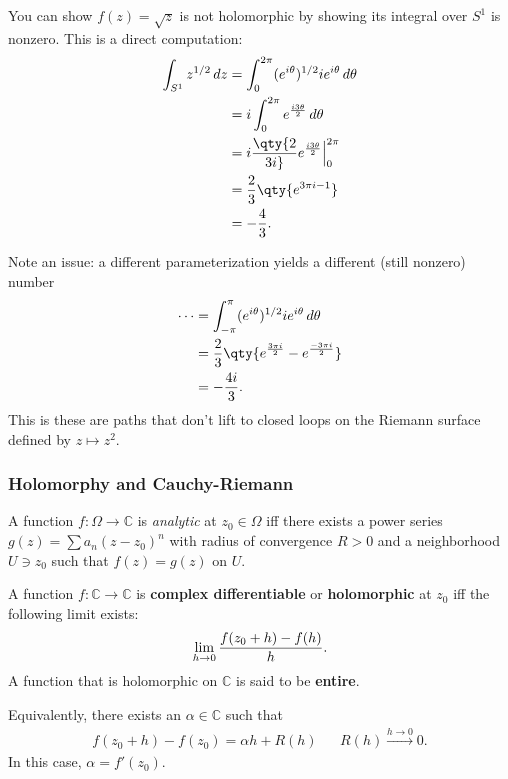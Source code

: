 \begin{example}[?]

You can show \(f(z) = \sqrt{z}\) is not holomorphic by showing its
integral over \(S^1\) is nonzero. This is a direct computation:
\begin{align*}
\int_{S^1} z^{1/2} \,dz
&= \int_0^{2\pi} (e^{i\theta})^{1/2} ie^{i\theta} \,d\theta\\
&= i \int_0^{2\pi} e^{i3\theta \over 2}\,d\theta\\
&= i \qty{2\over 3i} e^{i3\theta \over 2}\Big|_{0}^{2\pi} \\
&= {2\over 3}\qty{e^{3\pi i - 1}} \\
&= -{4\over 3}
.\end{align*}

Note an issue: a different parameterization yields a different (still
nonzero) number
\begin{align*}
\cdots 
&= \int_{-\pi}^{\pi} (e^{i\theta})^{1/2} ie^{i\theta} \,d\theta\\
&= {2\over 3}\qty{ e^{3\pi i \over 2} - e^{-3\pi i \over 2}} \\
&= -{4i\over 3}
.\end{align*}
This is these are paths that don't lift to closed loops on the Riemann
surface defined by \(z\mapsto z^2\).

\end{example}

\hypertarget{holomorphy-and-cauchy-riemann}{%
\subsubsection{Holomorphy and
Cauchy-Riemann}\label{holomorphy-and-cauchy-riemann}}

\begin{definition}[Analytic]

A function \(f:\Omega \to {\mathbb{C}}\) is \emph{analytic} at
\(z_0\in \Omega\) iff there exists a power series
\(g(z) = \sum a_n (z-z_0)^n\) with radius of convergence \(R>0\) and a
neighborhood \(U\ni z_0\) such that \(f(z) = g(z)\) on \(U\).

\end{definition}

\begin{definition}

A function \(f: {\mathbb{C}}\to {\mathbb{C}}\) is \textbf{complex
differentiable} or \textbf{holomorphic} at \(z_0\) iff the following
limit exists:
\begin{align*}
\lim_{h\to 0} { f(z_0 + h) - f(h) \over h  } 
.\end{align*}
A function that is holomorphic on \({\mathbb{C}}\) is said to be
\textbf{entire}.

Equivalently, there exists an \(\alpha\in {\mathbb{C}}\) such that
\begin{align*}
f(z_0+h) - f(z_0) = \alpha h + R(h) && R(h) \overset{h\to 0}\longrightarrow 0 
.\end{align*}
In this case, \(\alpha = f'(z_0)\).

\end{definition}

